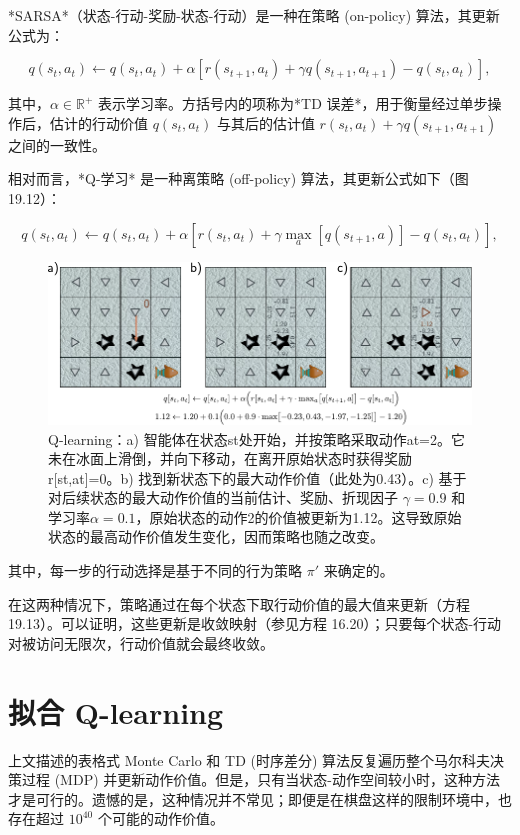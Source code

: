 \documentclass[lang=cn,newtx,10pt,scheme=chinese]{elegantbook}
\begin{document}
*SARSA*（状态-行动-奖励-状态-行动）是一种在策略 (on-policy) 算法，其更新公式为：

\begin{equation}
q(s_t, a_t) \leftarrow q(s_t, a_t) + \alpha \left[ r(s_{t+1}, a_t) + \gamma q(s_{t+1}, a_{t+1}) - q(s_t, a_t) \right], 
\end{equation}

其中，\(\alpha \in \mathbb{R}^+\) 表示学习率。方括号内的项称为*TD 误差*，用于衡量经过单步操作后，估计的行动价值 \(q(s_t, a_t)\) 与其后的估计值 \(r(s_t, a_t)+\gamma q(s_{t+1}, a_{t+1})\) 之间的一致性。

相对而言，*Q-学习* 是一种离策略 (off-policy) 算法，其更新公式如下（图 19.12）：

\begin{equation}
q(s_t, a_t) \leftarrow q(s_t, a_t) + \alpha \left[ r(s_t, a_t) + \gamma \max_{a} [q(s_{t+1}, a)] - q(s_t, a_t) \right], 
\end{equation}

\begin{figure}[ht!]
\centering
\includegraphics[width=0.7\linewidth]{PDFFigures/UDLChap19PDF/ReinforceTD.pdf}
\caption{Q-learning：a) 智能体在状态st处开始，并按策略采取动作at=2。它未在冰面上滑倒，并向下移动，在离开原始状态时获得奖励r[st,at]=0。b) 找到新状态下的最大动作价值（此处为0.43）。c) 基于对后续状态的最大动作价值的当前估计、奖励、折现因子 \(\gamma=0.9\) 和学习率\(\alpha=0.1\)，原始状态的动作2的价值被更新为1.12。这导致原始状态的最高动作价值发生变化，因而策略也随之改变。}
\end{figure}

其中，每一步的行动选择是基于不同的行为策略 \(\pi'\) 来确定的。

在这两种情况下，策略通过在每个状态下取行动价值的最大值来更新（方程 19.13）。可以证明，这些更新是收敛映射（参见方程 16.20）；只要每个状态-行动对被访问无限次，行动价值就会最终收敛。

\section{拟合 Q-learning}
上文描述的表格式 Monte Carlo 和 TD (时序差分) 算法反复遍历整个马尔科夫决策过程 (MDP) 并更新动作价值。但是，只有当状态-动作空间较小时，这种方法才是可行的。遗憾的是，这种情况并不常见；即便是在棋盘这样的限制环境中，也存在超过 \(10^{40}\) 个可能的动作价值。
\end{document}
